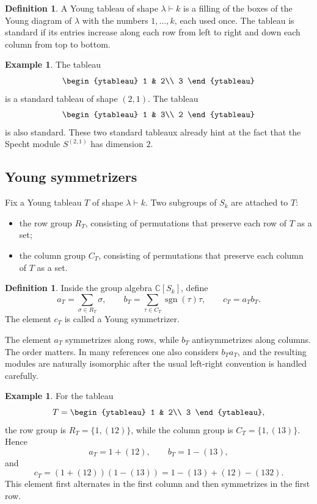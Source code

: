 \documentclass[12pt,a4paper]{article}
\theoremstyle{definition}
\newtheorem{definition}[theorem]{Definition}
\newtheorem{example}[theorem]{Example}
\theoremstyle{remark}
\newcommand{\C}{\mathbb{C}}
\newcommand{\sgn}{\operatorname{sgn}}
\begin{document}
\begin{definition}
A Young tableau of shape \(\lambda\vdash k\) is a filling of the boxes of the
Young diagram of \(\lambda\) with the numbers \(1,\dots,k\), each used once.
The tableau is standard if its entries increase along each row from left to
right and down each column from top to bottom.
\end{definition}

\begin{example}
The tableau
\[
\begin{ytableau}
1 & 2\\
3
\end{ytableau}
\]
is a standard tableau of shape \((2,1)\).  The tableau
\[
\begin{ytableau}
1 & 3\\
2
\end{ytableau}
\]
is also standard.  These two standard tableaux already hint at the fact that
the Specht module \(S^{(2,1)}\) has dimension \(2\).
\end{example}

\subsection{Young symmetrizers}

Fix a Young tableau \(T\) of shape \(\lambda\vdash k\).  Two subgroups of
\(S_k\) are attached to \(T\):
\begin{itemize}[leftmargin=2.2em]
  \item the row group \(R_T\), consisting of permutations that preserve each
  row of \(T\) as a set;
  \item the column group \(C_T\), consisting of permutations that preserve
  each column of \(T\) as a set.
\end{itemize}

\begin{definition}
Inside the group algebra \(\C[S_k]\), define
\[
a_T=\sum_{\sigma\in R_T}\sigma,
\qquad
b_T=\sum_{\tau\in C_T}\sgn(\tau)\tau,
\qquad
c_T=a_Tb_T.
\]
The element \(c_T\) is called a Young symmetrizer.
\end{definition}

The element \(a_T\) symmetrizes along rows, while \(b_T\) antisymmetrizes
along columns.  The order matters.  In many references one also considers
\(b_Ta_T\), and the resulting modules are naturally isomorphic after the
usual left-right convention is handled carefully.

\begin{example}
For the tableau
\[
T=
\begin{ytableau}
1 & 2\\
3
\end{ytableau},
\]
the row group is \(R_T=\{1,(12)\}\), while the column group is
\(C_T=\{1,(13)\}\).  Hence
\[
a_T=1+(12),\qquad b_T=1-(13),
\]
and
\[
c_T=(1+(12))(1-(13))
  =1-(13)+(12)-(132).
\]
This element first alternates in the first column and then symmetrizes in the
first row.
\end{example}
\end{document}

